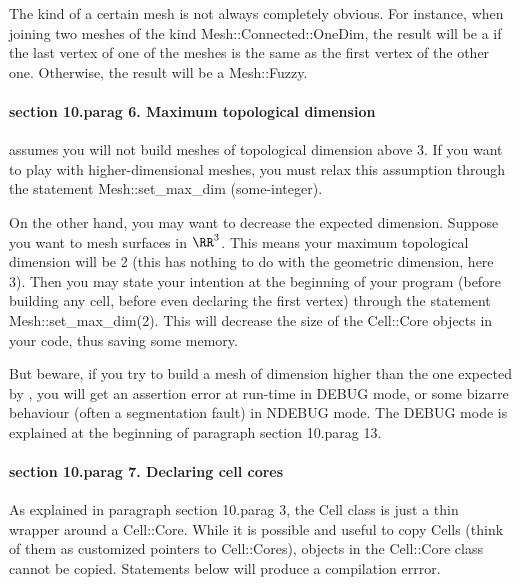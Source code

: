 The kind of a certain mesh is not always completely obvious.
For instance, when {\codett join}ing two meshes of the kind {\codett Mesh::Connected::OneDim},
the result will be a if the last vertex of one of the meshes
is the same as the first vertex of the other one.
Otherwise, the result will be a {\codett Mesh::Fuzzy}.
\vfil\eject


\paragraph{\numb section 10.\numb parag 6. Maximum topological dimension}

\leavevmode {\ManiFEM} assumes you will not build meshes of topological dimension
above 3.
If you want to play with higher-dimensional meshes, you must relax this assumption
through the statement {\codett Mesh::set\_max\_dim (}some-integer{\codett )}.

On the other hand, you may want to decrease the expected dimension.
Suppose you want to mesh surfaces in $ \RR^3 $.
This means your maximum topological dimension will be 2
(this has nothing to do with the geometric dimension, here 3).
Then you may state your intention at the beginning of your program
(before building any cell, before even declaring the first vertex) through
the statement {\codett Mesh::set\_max\_dim(2)}.
This will decrease the size of the {\codett Cell::Core} objects in your code,
thus saving some memory.

But beware, if you try to build a mesh of dimension higher than the one expected by
\maniFEM, you will get an {\codett assertion error} at run-time in {\codett DEBUG} mode,
or some bizarre behaviour (often a {\codett segmentation fault}) in {\codett NDEBUG} mode.
The {\codett DEBUG} mode is explained at the beginning of paragraph \numb section
10.\numb parag 13.


\paragraph{\numb section 10.\numb parag 7. Declaring cell cores}

As explained in paragraph \numb section 10.\numb parag 3, the {\codett Cell} class is
just a thin wrapper around a {\codett Cell::Core}.
While it is possible and useful to copy {\codett Cell}s (think of them as customized
pointers to {\codett Cell::Core}s), objects in the {\codett Cell::Core} class cannot be copied.
Statements below will produce a compilation errror.

